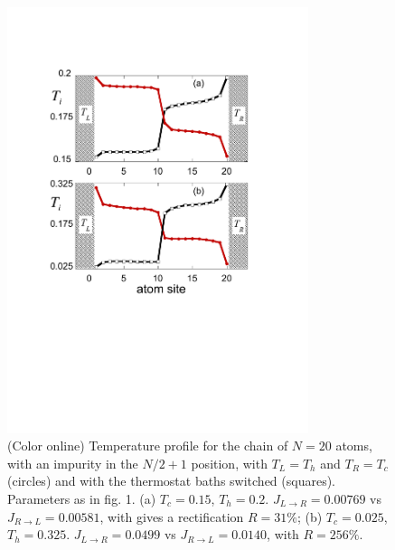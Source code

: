 \begin{figure}
\centering
\includegraphics[width=8.8cm]{Figures/FIG4b.pdf}
\caption{(Color online) Temperature profile for the chain of $N=20$ atoms, with an impurity in the $N/2+1$ position, with $T_L=T_h$ and $T_R=T_c$ (circles) and with the thermostat baths switched (squares).
Parameters as in fig. 1.
(a) $T_c=0.15$, $T_h=0.2$. $J_{L\rightarrow R}=0.00769$ vs $J_{R\rightarrow L}=0.00581$, with gives a rectification $R=31 \% $; (b) $T_c=0.025$, $T_h=0.325$. $J_{L\rightarrow R}=0.0499$ vs  $J_{R\rightarrow L}=0.0140$, with $R=256 \%$.}
\label{figure4}
\end{figure}



